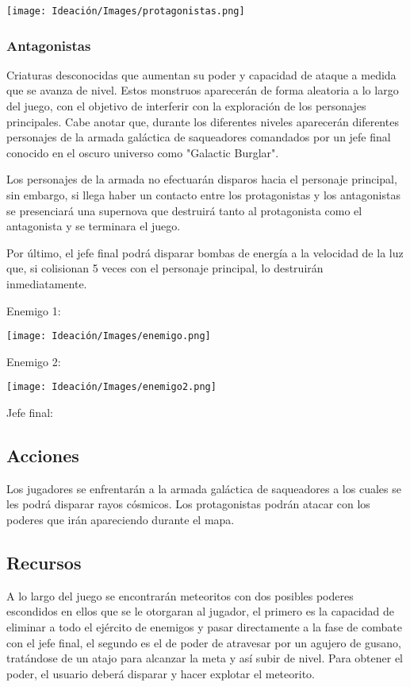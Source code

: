 \documentclass{article}
\begin{document}
\texttt{[image: Ideación/Images/protagonistas.png]}

\subsubsection{Antagonistas}
Criaturas desconocidas que aumentan su poder y capacidad de ataque a medida que se avanza de nivel. Estos monstruos aparecerán de forma aleatoria a lo largo del juego, con el objetivo de interferir con la exploración de los personajes principales. Cabe anotar que, durante los diferentes niveles aparecerán diferentes personajes de la armada galáctica de saqueadores comandados por un jefe final conocido en el oscuro universo como "Galactic Burglar". 

Los personajes de la armada no efectuarán disparos hacia el personaje principal, sin embargo, si llega haber un contacto entre los protagonistas y los antagonistas se presenciará una supernova que destruirá tanto al protagonista como el antagonista y se terminara el juego. 

Por último, el jefe final podrá disparar bombas de energía a la velocidad de la luz que, si colisionan 5 veces con el personaje principal, lo destruirán inmediatamente. 

Enemigo 1: 


\texttt{[image: Ideación/Images/enemigo.png]}

Enemigo 2:

\texttt{[image: Ideación/Images/enemigo2.png]}

Jefe final: 



\subsection{Acciones}
Los jugadores se enfrentarán a la armada galáctica de saqueadores a los cuales se les podrá disparar rayos cósmicos. 
Los protagonistas podrán atacar con los poderes que irán apareciendo durante el mapa.

\subsection{Recursos}
A lo largo del juego se encontrarán meteoritos con dos posibles poderes escondidos en ellos que se le otorgaran al jugador, el primero es la capacidad de eliminar a todo el ejército de enemigos y pasar directamente a la fase de combate con el jefe final, el segundo es el de poder de atravesar por un agujero de gusano, tratándose de un atajo para alcanzar la meta y así subir de nivel. 
Para obtener el poder, el usuario deberá disparar y hacer explotar el meteorito.
\end{document}
